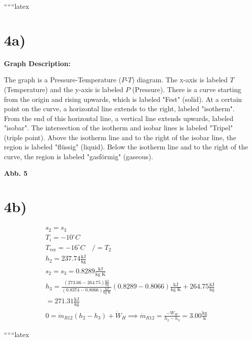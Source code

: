 
``````latex


\section*{4a)}

\begin{center}
\textbf{Graph Description:}
\end{center}

The graph is a Pressure-Temperature ($P$-$T$) diagram. The x-axis is labeled $T$ (Temperature) and the y-axis is labeled $P$ (Pressure). There is a curve starting from the origin and rising upwards, which is labeled "Fest" (solid). At a certain point on the curve, a horizontal line extends to the right, labeled "isotherm". From the end of this horizontal line, a vertical line extends upwards, labeled "isobar". The intersection of the isotherm and isobar lines is labeled "Tripel" (triple point). Above the isotherm line and to the right of the isobar line, the region is labeled "flüssig" (liquid). Below the isotherm line and to the right of the curve, the region is labeled "gasförmig" (gaseous).

\begin{center}
\textbf{Abb. 5}
\end{center}

\section*{4b)}

\begin{align*}
& s_2 = s_3 \\
& T_i = -10^\circ C \\
& T_{\text{ver}} = -16^\circ C \quad / = T_2 \\
& h_2 = 237.74 \frac{\text{kJ}}{\text{kg}} \\
& s_2 = s_3 = 0.8289 \frac{\text{kJ}}{\text{kg K}} \\
& h_3 = \frac{(273.66 - 264.75) \frac{\text{kJ}}{\text{kg}}}{(0.8374 - 0.8066) \frac{\text{kJ}}{\text{kg K}}} (0.8289 - 0.8066) \frac{\text{kJ}}{\text{kg K}} + 264.75 \frac{\text{kJ}}{\text{kg}} \\
& = 271.31 \frac{\text{kJ}}{\text{kg}} \\
& 0 = \dot{m}_{R12} (h_2 - h_3) + \dot{W}_H \implies \dot{m}_{R12} = \frac{-\dot{W}_H}{h_2 - h_3} = 3.00 \frac{\text{kg}}{\text{h}}
\end{align*}

``````latex


